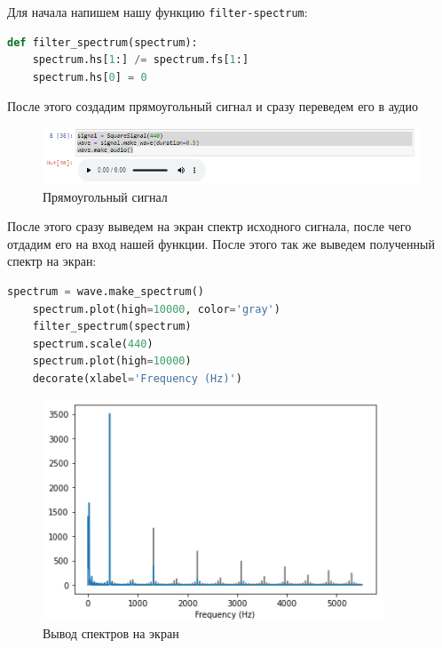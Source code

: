 \documentclass[a4paper]{article}
\begin{document}
            Для начала напишем нашу функцию \texttt{filter-spectrum}:
            
\begin{lstlisting}[language=Python, caption= filter-spectrum]
    def filter_spectrum(spectrum):
    spectrum.hs[1:] /= spectrum.fs[1:]
    spectrum.hs[0] = 0
\end{lstlisting}  
           
           После этого создадим прямоугольный сигнал и сразу переведем его в аудио

            \begin{figure}[H]
                \centering
                \includegraphics[width=\textwidth]{ex_5_square_signal.png}
                \caption{Прямоугольный сигнал}
                \label{fig:ex_5_square_signal}
            \end{figure}
            
            После этого сразу выведем на экран спектр исходного сигнала, после чего отдадим его на вход нашей функции. После этого так же выведем полученный спектр на экран:
            
\begin{lstlisting}[language=Python, caption= Работа с сигналами]
    spectrum = wave.make_spectrum()
    spectrum.plot(high=10000, color='gray')
    filter_spectrum(spectrum)
    spectrum.scale(440)
    spectrum.plot(high=10000)
    decorate(xlabel='Frequency (Hz)')
\end{lstlisting}               
            
            \begin{figure}[H]
                \centering
                \includegraphics[width=\textwidth]{ex_5_spectr_compare.png}
                \caption{Вывод спектров на экран}
                \label{fig:ex_5_spectr_compare}
            \end{figure}
           
\end{document}
